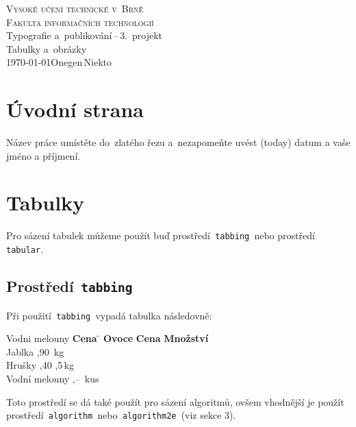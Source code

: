 \documentclass[a4paper, 11pt]{article}
\begin{document}
\begin{titlepage}
	\begin{center}
		{\Huge \textsc{Vysoké učení technické v~Brně}\\}
		{\huge \textsc{Fakulta informačních technologií}\\}
		{\LARGE Typografie a~publikování\,--\,3.\ projekt\\}
		{\Huge Tabulky a~obrázky\\}
		{\Large \today \hfill Onegen\,Niekto}
	\end{center}
\end{titlepage}

\section{Úvodní strana}

Název práce umístěte do~zlatého řezu a~nezapomeňte uvést  (today)
datum a vaše jméno a příjmení.

\section{Tabulky}

Pro sázení tabulek můžeme použít buď prostředí\texttt{ tabbing }nebo
prostředí\texttt{ tabular}.

\subsection{Prostředí\texttt{ tabbing}}

Při použití\texttt{ tabbing }vypadá tabulka následovně:
%
\begin{tabbing}
	Vodni melouny \quad  \= \textbf{Cena} \quad \=                \kill
	\textbf{Ovoce}       \> \textbf{Cena}       \> \textbf{Množství} \\
	Jablka               ,90               \,kg             \\
	Hrušky               ,40               ,5\,kg           \\
	Vodní melouny        ,--               \,kus            \\
\end{tabbing}

\noindent
Toto prostředí se dá také použít pro sázení algoritmů, ovšem vhodnější je
použít prostředí\texttt{ algorithm }nebo\texttt{ algorithm2e }(viz sekce
3).
\end{document}
